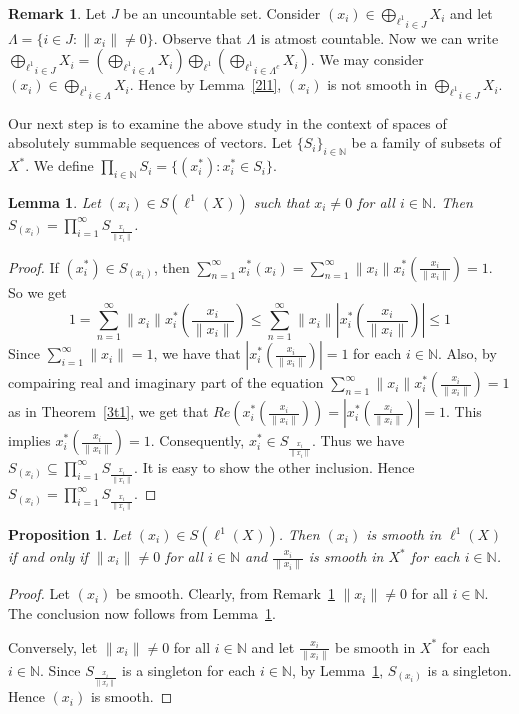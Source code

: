 \documentclass[12pt]{amsart}
\newtheorem{lemma}[theorem]{Lemma}
\newtheorem{proposition}[theorem]{Proposition}
\theoremstyle{definition}
\newtheorem{remark}[theorem]{Remark}
\numberwithin{equation}{section}
\begin{document}
\begin{remark}\label{2p0}
 Let $J$ be an uncountable set. Consider $(x_i)\in {\bigoplus_{\ell^1}}_{i\in J}{X_i}$ and let $\Lambda=\{i\in J:\|x_i\|\neq 0\}$. Observe that $\Lambda$ is atmost countable. Now we can write ${\bigoplus_{\ell^1}}_{i\in J}X_i=\left({\bigoplus_{\ell^1}}_{i\in \Lambda}X_i\right) \bigoplus_{\ell^1} \left({\bigoplus_{\ell^1}}_{i\in \Lambda^c}X_i\right)$. We may consider $(x_i)\in {\bigoplus_{\ell^1}}_{i\in \Lambda}X_i$. Hence by Lemma~\ref{2l1}, $(x_{i})$ is not smooth in ${\bigoplus_{\ell^1}}_{i\in J}{X_i}$.
\end{remark}

Our next step is to examine the above study in the context of spaces of absolutely summable sequences of vectors. Let $\{S_i\}_{i\in \mathbb{N}}$ be a family of subsets of $X^*$. We define $\prod_{i\in \mathbb{N}}S_i=\{(x^*_i):x_i^*\in S_i\}$.
\begin{lemma}\label{nadd}
Let $(x_i)\in S(\ell^1(X_{}))$ such that $x_i\neq 0$ for all $i\in \mathbb{N}$. Then $S_{(x_i)}=\prod_{i=1}^{\infty}S_{\frac{x_i}{\|x_{i}\|}}$.
\end{lemma}
\begin{proof}
If $(x^*_{i})\in S_{(x_i)}$, then $\sum_{n=1}^{\infty}x_{i}^*(x_{i}) = \sum_{n=1}^{\infty}\|x_{i}\|x_{i}^*(\frac{x_{i}}{\|x_{i}\|})=1$. So we get
\[
1=\sum_{n=1}^{\infty}\|x_{i}\|x_{i}^*(\frac{x_{i}}{\|x_{i}\|})\leq \sum_{n=1}^{\infty}\|x_{i}\||x_{i}^*(\frac{x_{i}}{\|x_{i}\|})|\leq1 
\]
Since $\sum_{i=1}^{\infty}\|x_{i}\|=1$, we have that $|x_{i}^*(\frac{x_{i}}{\|x_{i}\|})|=1$ for each $i\in\mathbb{N}$. Also, by compairing real and imaginary part of the equation $\sum_{n=1}^{\infty}\|x_{i}\|x_{i}^*(\frac{x_{i}}{\|x_{i}\|})=1$ as in Theorem~\ref{3t1}, we get that $Re(x_{i}^*(\frac{x_{i}}{\|x_{i}\|}))=|x_{i}^*(\frac{x_{i}}{\|x_{i}\|})|=1$. This implies $x_{i}^*(\frac{x_{i}}{\|x_{i}\|})=1$. Consequently, $x_{i}^*\in S_{\frac{x_i}{\|x_{i}\|}}$. Thus we have $S_{(x_i)}\subseteq\prod_{i=1}^{\infty}S_{\frac{x_i}{\|x_{i}\|}}$. It is easy to show the other inclusion. Hence $S_{(x_i)}=\prod_{i=1}^{\infty}S_{\frac{x_i}{\|x_{i}\|}}$.
\end{proof}
\begin{proposition}\label{2p2}
    Let $(x_i)\in S(\ell^1(X_{}))$. Then $(x_i)$ is smooth in $\ell^1(X_{})$ if and only if $\|x_i\|\neq 0$ for all $i\in \mathbb{N}$ and $\frac{x_i}{\|x_i\|}$ is smooth in $X_{}^*$ for each $i\in \mathbb{N}$.
\end{proposition}
\begin{proof}
   Let $(x_{i})$ be smooth. Clearly, from Remark~\ref{2p0} $\|x_{i}\|\neq0$ for all $i\in \mathbb{N}$. The conclusion now follows from Lemma~\ref{nadd}.
   
   Conversely, let $\|x_{i}\|\neq0$ for all $i\in \mathbb{N}$ and let $\frac{x_i}{\|x_i\|}$ be smooth in $X_{}^*$ for each $i\in \mathbb{N}$. Since $S_{\frac{x_i}{\|x_{i}\|}}$ is a singleton for each $i\in \mathbb{N}$, by Lemma~\ref{nadd}, $S_{(x_{i})}$ is a singleton. Hence $(x_{i})$ is smooth.
\end{proof}
\end{document}
